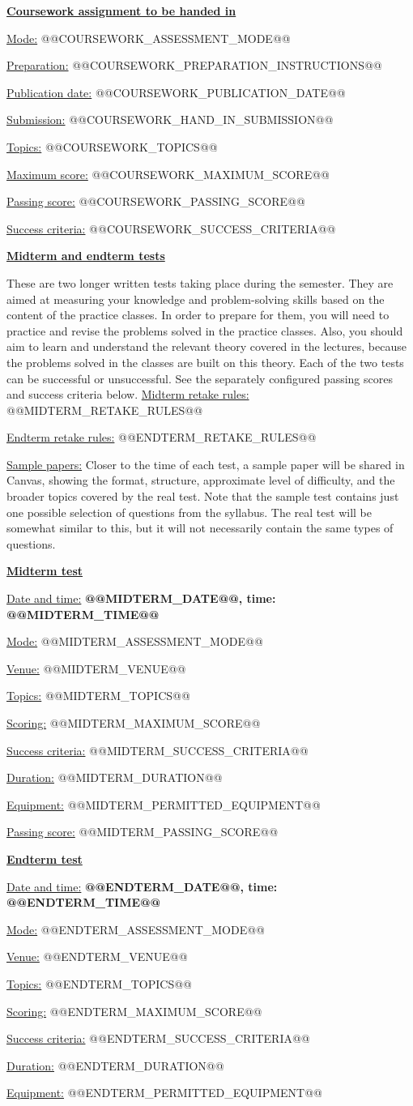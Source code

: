 \documentclass[11pt,a4paper]{article}
\newcommand{\assessment}[1]{\par\medskip\textbf{\underline{#1}}\par}
\newcommand{\field}[2]{\underline{#1:} #2\par}
\begin{document}
\assessment{Coursework assignment to be handed in}
\field{Mode}{@@COURSEWORK_ASSESSMENT_MODE@@}
\field{Preparation}{@@COURSEWORK_PREPARATION_INSTRUCTIONS@@}
\field{Publication date}{@@COURSEWORK_PUBLICATION_DATE@@}
\field{Submission}{@@COURSEWORK_HAND_IN_SUBMISSION@@}
\field{Topics}{@@COURSEWORK_TOPICS@@}
\field{Maximum score}{@@COURSEWORK_MAXIMUM_SCORE@@}
\field{Passing score}{@@COURSEWORK_PASSING_SCORE@@}
\field{Success criteria}{@@COURSEWORK_SUCCESS_CRITERIA@@}

\assessment{Midterm and endterm tests}
These are two longer written tests taking place during the semester. They are aimed at measuring your knowledge and problem-solving skills based on the content of the practice classes. In order to prepare for them, you will need to practice and revise the problems solved in the practice classes. Also, you should aim to learn and understand the relevant theory covered in the lectures, because the problems solved in the classes are built on this theory. Each of the two tests can be successful or unsuccessful. See the separately configured passing scores and success criteria below.
\field{Midterm retake rules}{@@MIDTERM_RETAKE_RULES@@}
\field{Endterm retake rules}{@@ENDTERM_RETAKE_RULES@@}
\field{Sample papers}{Closer to the time of each test, a sample paper will be shared in Canvas, showing the format, structure, approximate level of difficulty, and the broader topics covered by the real test. Note that the sample test contains just one possible selection of questions from the syllabus. The real test will be somewhat similar to this, but it will not necessarily contain the same types of questions.}

\newpage
\assessment{Midterm test}
\field{Date and time}{\textbf{@@MIDTERM_DATE@@, time: @@MIDTERM_TIME@@}}
\field{Mode}{@@MIDTERM_ASSESSMENT_MODE@@}
\field{Venue}{@@MIDTERM_VENUE@@}
\field{Topics}{@@MIDTERM_TOPICS@@}
\field{Scoring}{@@MIDTERM_MAXIMUM_SCORE@@}
\field{Success criteria}{@@MIDTERM_SUCCESS_CRITERIA@@}
\field{Duration}{@@MIDTERM_DURATION@@}
\field{Equipment}{@@MIDTERM_PERMITTED_EQUIPMENT@@}

\field{Passing score}{@@MIDTERM_PASSING_SCORE@@}
\assessment{Endterm test}
\field{Date and time}{\textbf{@@ENDTERM_DATE@@, time: @@ENDTERM_TIME@@}}
\field{Mode}{@@ENDTERM_ASSESSMENT_MODE@@}
\field{Venue}{@@ENDTERM_VENUE@@}
\field{Topics}{@@ENDTERM_TOPICS@@}
\field{Scoring}{@@ENDTERM_MAXIMUM_SCORE@@}
\field{Success criteria}{@@ENDTERM_SUCCESS_CRITERIA@@}
\field{Duration}{@@ENDTERM_DURATION@@}
\field{Equipment}{@@ENDTERM_PERMITTED_EQUIPMENT@@}
\end{document}
